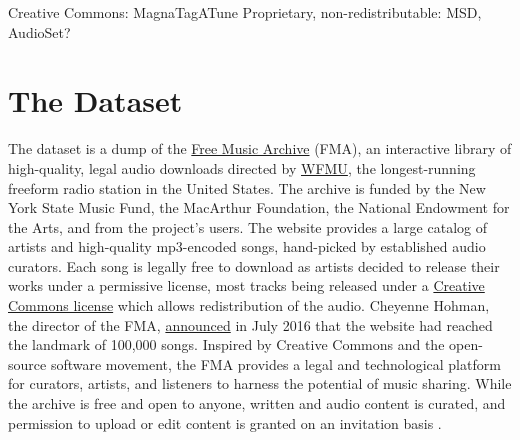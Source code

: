 \documentclass{article}
\begin{document}
Creative Commons: MagnaTagATune
Proprietary, non-redistributable: MSD, AudioSet?




\section{The Dataset} %




The dataset is a dump of the \href{https://freemusicarchive.org/}{Free Music Archive} (FMA), an interactive library of high-quality, legal audio downloads directed by \href{https://wfmu.org/}{WFMU}, the longest-running freeform radio station in the United States.
The archive is funded by the New York State Music Fund, the MacArthur Foundation, the National Endowment for the Arts, and from the project's users.
The website provides a large catalog of artists and high-quality mp3-encoded songs, hand-picked by established audio curators. Each song is legally free to download as artists decided to release their works under a permissive license, most tracks being released under a \href{https://creativecommons.org/}{Creative Commons license} which allows redistribution of the audio. Cheyenne Hohman, the director of the FMA, \href{http://freemusicarchive.org/member/cheyenne_h/blog/100000_SONGS}{announced} in July 2016 that the website had reached the landmark of 100,000 songs.
Inspired by Creative Commons and the open-source software movement, the FMA provides a legal and technological platform for curators, artists, and listeners to harness the potential of music sharing. While the archive is free and open to anyone, written and audio content is curated, and permission to upload or edit content is granted on an invitation basis \cite{art:MossFMA}.
\end{document}
